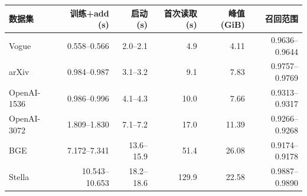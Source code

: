 \begin{tabular}{@{}lrrrrr@{}}
\toprule
数据集 & 训练+add (s) & 启动 (s) & 首次读取 (s) & 峰值 (GiB) & 召回范围 \\
\midrule
Vogue & 0.558--0.566 & 2.0--2.1 & 4.9 & 4.11 & 0.9636--0.9644 \\
arXiv & 0.984--0.987 & 3.1--3.2 & 9.1 & 7.83 & 0.9757--0.9769 \\
OpenAI-1536 & 0.986--0.996 & 4.1--4.3 & 10.0 & 7.66 & 0.9313--0.9317 \\
OpenAI-3072 & 1.809--1.830 & 7.1--7.2 & 17.0 & 11.39 & 0.9266--0.9268 \\
BGE & 7.172--7.341 & 13.6--15.9 & 51.4 & 26.08 & 0.9174--0.9178 \\
Stella & 10.543--10.653 & 18.2--18.6 & 129.9 & 22.58 & 0.9887--0.9890 \\
\bottomrule
\end{tabular}
